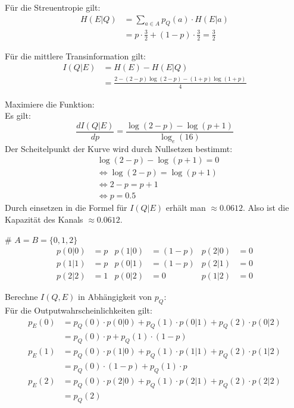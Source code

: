 \begin{myList}
Für die Streuentropie gilt:
\begin{align*}
	H(E|Q) &= \sum\limits_{a \in A} p_Q(a) \cdot H(E|a) \\
	&= p \cdot \frac{3}{2} + (1-p) \cdot \frac{3}{2} = \frac{3}{2}
\end{align*}

Für die mittlere Transinformation gilt:
\begin{align*}
	I(Q|E) &= H(E) - H(E|Q)\\
	&= \frac{2 -(2-p)\log(2-p) - (1+p)\log(1+p)}{4}
\end{align*}

Maximiere die Funktion:\\
Es gilt:
\begin{equation*}
	\frac{dI(Q|E)}{dp} = \frac{\log(2-p)- \log(p+1)}{\log_e(16)}
\end{equation*}
Der Scheitelpunkt der Kurve wird durch Nullsetzen bestimmt:
\begin{align*}
	&\log(2-p) - \log(p+1) = 0 \\
	&\Leftrightarrow \log(2-p) = \log(p+1) \\
	&\Leftrightarrow 2-p = p+1 \\
	&\Leftrightarrow p = 0.5
\end{align*}
Durch einsetzen in die Formel für $I(Q|E)$ erhält man $\approx 0.0612$.
Also ist die Kapazität des Kanals $\approx 0.0612$.

#
$A = B = \lbrace 0,1,2 \rbrace$
\begin{align*}
	p(0|0) &= p & p(1|0) &= (1-p) & p(2|0) &= 0 \\
	p(1|1) &= p & p(0|1) &= (1-p) & p(2|1) &= 0 \\
	p(2|2) &= 1 & p(0|2) &= 0 & p(1|2) &= 0
\end{align*}

Berechne $I(Q,E)$ in Abhängigkeit von $p_Q$:\\
Für die Outputwahrscheinlichkeiten gilt:
\begin{align*}
	p_E(0) &= p_Q(0) \cdot p(0|0) + p_Q(1) \cdot p(0|1) + p_Q(2) \cdot p(0|2) \\
	&= p_Q(0) \cdot p + p_Q(1) \cdot (1-p) \\
	p_E(1) &= p_Q(0) \cdot p(1|0) + p_Q(1) \cdot p(1|1) + p_Q(2) \cdot p(1|2)\\
	&= p_Q(0) \cdot (1-p) + p_Q(1) \cdot p \\
	p_E(2) &= p_Q(0) \cdot p(2|0) + p_Q(1) \cdot p(2|1) + p_Q(2) \cdot p(2|2)\\
	&= p_Q(2)
\end{align*}


\end{myList}
